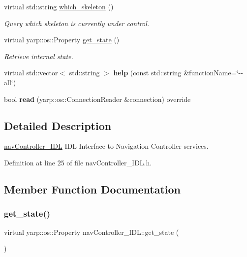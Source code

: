 \begin{DoxyCompactItemize}
virtual std\+::string \hyperlink{classnavController__IDL_ae7a1cd7d5d35831bf7851a9cf15577c8}{which\+\_\+skeleton} ()
\begin{DoxyCompactList}\small\item\em Query which skeleton is currently under control. \end{DoxyCompactList}\item 
virtual yarp\+::os\+::\+Property \hyperlink{classnavController__IDL_a24e454dd1fa72ebcd6f18d4213487106}{get\+\_\+state} ()
\begin{DoxyCompactList}\small\item\em Retrieve internal state. \end{DoxyCompactList}\item 
\mbox{\label{classnavController__IDL_ad653d3057cb43837b61939d92db9ac6e}} 
virtual std\+::vector$<$ std\+::string $>$ {\bfseries help} (const std\+::string \&function\+Name=\char`\"{}-\/-\/all\char`\"{})
\item 
\mbox{\label{classnavController__IDL_a332b70512a6e8a6a90b83077ee470558}} 
bool {\bfseries read} (yarp\+::os\+::\+Connection\+Reader \&connection) override
\end{DoxyCompactItemize}


\subsection{Detailed Description}
\hyperlink{classnavController__IDL}{nav\+Controller\+\_\+\+I\+DL} I\+DL Interface to Navigation Controller services. 

Definition at line 25 of file nav\+Controller\+\_\+\+I\+D\+L.\+h.



\subsection{Member Function Documentation}
\mbox{\label{classnavController__IDL_a24e454dd1fa72ebcd6f18d4213487106}} 
\subsubsection{\texorpdfstring{get\+\_\+state()}{get\_state()}}
{\footnotesize\ttfamily virtual yarp\+::os\+::\+Property nav\+Controller\+\_\+\+I\+D\+L\+::get\+\_\+state (\begin{DoxyParamCaption}{ }\end{DoxyParamCaption})\hspace{0.3cm}{\ttfamily [virtual]}}



